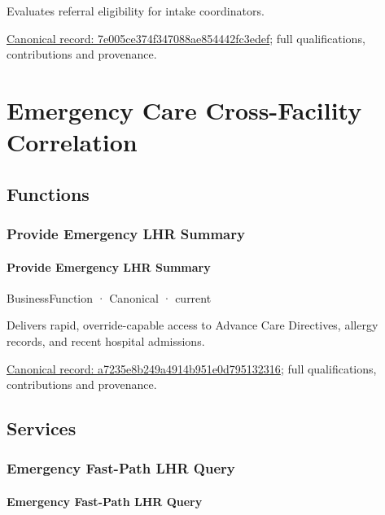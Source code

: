 Evaluates referral eligibility for intake coordinators.


{\footnotesize \href{../../../../continuum/business/business-service/7e005ce374f347088ae854442fc3edef.md}{Canonical record: 7e005ce374f347088ae854442fc3edef}; full qualifications, contributions and provenance.}\par
\section{Emergency Care Cross-Facility Correlation}

\subsection{Functions}

\subsubsection{Provide Emergency LHR Summary}

\paragraph{Provide Emergency LHR Summary}

\label{element:a7235e8b249a4914b951e0d795132316}
{\small BusinessFunction · Canonical · current}\par

Delivers rapid, override-capable access to Advance Care Directives, allergy records, and recent hospital admissions.


{\footnotesize \href{../../../../continuum/business/business-function/a7235e8b249a4914b951e0d795132316.md}{Canonical record: a7235e8b249a4914b951e0d795132316}; full qualifications, contributions and provenance.}\par
\subsection{Services}

\subsubsection{Emergency Fast-Path LHR Query}

\paragraph{Emergency Fast-Path LHR Query}


